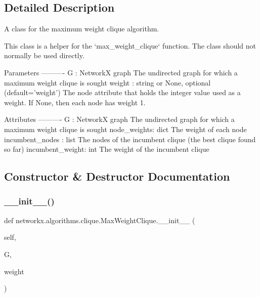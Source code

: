 \subsection{Detailed Description}
\begin{DoxyVerb}A class for the maximum weight clique algorithm.

This class is a helper for the `max_weight_clique` function.  The class
should not normally be used directly.

Parameters
----------
G : NetworkX graph
    The undirected graph for which a maximum weight clique is sought
weight : string or None, optional (default='weight')
    The node attribute that holds the integer value used as a weight.
    If None, then each node has weight 1.

Attributes
----------
G : NetworkX graph
    The undirected graph for which a maximum weight clique is sought
node_weights: dict
    The weight of each node
incumbent_nodes : list
    The nodes of the incumbent clique (the best clique found so far)
incumbent_weight: int
    The weight of the incumbent clique
\end{DoxyVerb}
 

\subsection{Constructor \& Destructor Documentation}
\mbox{\label{classnetworkx_1_1algorithms_1_1clique_1_1MaxWeightClique_adab3a8caa38decccd41f1fcd23c24834}} 
\subsubsection{\texorpdfstring{\+\_\+\+\_\+init\+\_\+\+\_\+()}{\_\_init\_\_()}}
{\footnotesize\ttfamily def networkx.\+algorithms.\+clique.\+Max\+Weight\+Clique.\+\_\+\+\_\+init\+\_\+\+\_\+ (\begin{DoxyParamCaption}\item[{}]{self,  }\item[{}]{G,  }\item[{}]{weight }\end{DoxyParamCaption})}



